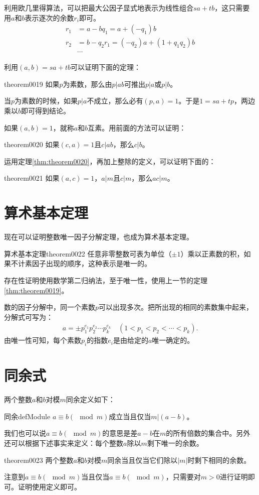 利用欧几里得算法，可以把最大公因子显式地表示为线性组合$sa+tb$，这只需要用$a$和$b$表示逐次的余数$r_i$即可。
\[
\begin{aligned}
r_1 &= a - bq_1 = a + (-q_1)b \\
r_2 &= b - q_2r_1 = (-q_2)a + (1 + q_1q_2)b \\
&\cdots
\end{aligned}
\]

利用$(a, b) = sa+tb$可以证明下面的定理：
\begin{theorem}{}{theorem0019}
如果$p$为素数，那么由$p|ab$可推出$p|a$或$p|b$。
\end{theorem}

当$p$为素数的时候，如果$p|a$不成立，那么必有$(p, a)=1$。于是$1 = sa+tp$，两边乘以$b$即可得到结论。

如果$(a, b)=1$，就称$a$和$b$互素。用前面的方法可以证明：
\begin{theorem}{}{theorem0020}
如果$(c, a)=1$且$c|ab$，那么$c|b$。
\end{theorem}

运用定理\ref{thm:theorem0020}，再加上整除的定义，可以证明下面的：
\begin{theorem}{}{theorem0021}
如果$(a, c)=1$，$a|m$且$c|m$，那么$ac|m$。
\end{theorem}


\section{算术基本定理}\label{subsection0010108}
现在可以证明整数唯一因子分解定理，也成为算术基本定理。
\begin{theorem}{算术基本定理}{theorem0022}
任意非零整数可表为单位（$\pm{}1$）乘以正素数的积，如果不计素因子出现的顺序，这种表示是唯一的。
\end{theorem}

存在性证明使用数学第二归纳法，至于唯一性，使用上一节的定理\ref{thm:theorem0019}。

数的因子分解中，同一个素数$p$可以出现多次。把所出现的相同的素数集中起来，分解式可写为：
\begin{gather}\label{equation0015}
a = \pm{}p_1^{e_1}p_2^{e_2} \cdots p_k^{e_k} \quad (1 < p_1 < p_2 < \cdots < p_k).
\end{gather}
由唯一性可知，每个素数$p_i$的指数$e_i$是由给定的$a$唯一确定的。


\section{同余式}\label{subsection0010109}
两个整数$a$和$b$对模$m$同余定义如下：
\begin{definition}{同余}{defModule}
$a \equiv b (\mod{m})$成立当且仅当$m|(a-b)$。
\end{definition}
我们也可以说$a \equiv b(\mod{m})$的意思是差$a-b$在$m$的所有倍数的集合中。另外还可以根据下述事实来定义：每个整数$a$除以$m$剩下唯一的余数。
\begin{theorem}{}{theorem0023}
两个整数$a$和$b$对模$m$同余当且仅当它们除以$|m|$时剩下相同的余数。
\end{theorem}
注意到$a \equiv b(\mod{m})$当且仅当$a \equiv b(\mod{m})$，只需要对$m>0$进行证明即可。证明使用定义即可。

